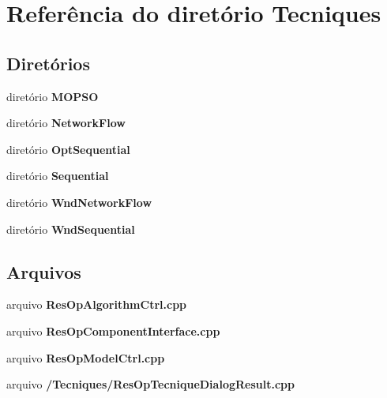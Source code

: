 \section{Referência do diretório Tecniques}
\label{dir_43d5b497050efb90fdba5febc88629da}
\subsection*{Diretórios}
\begin{DoxyCompactItemize}
\item 
diretório {\bf M\+O\+P\+SO}
\item 
diretório {\bf Network\+Flow}
\item 
diretório {\bf Opt\+Sequential}
\item 
diretório {\bf Sequential}
\item 
diretório {\bf Wnd\+Network\+Flow}
\item 
diretório {\bf Wnd\+Sequential}
\end{DoxyCompactItemize}
\subsection*{Arquivos}
\begin{DoxyCompactItemize}
\item 
arquivo {\bf Res\+Op\+Algorithm\+Ctrl.\+cpp}
\item 
arquivo {\bf Res\+Op\+Component\+Interface.\+cpp}
\item 
arquivo {\bf Res\+Op\+Model\+Ctrl.\+cpp}
\item 
arquivo {\bf /\+Tecniques/\+Res\+Op\+Tecnique\+Dialog\+Result.\+cpp}
\end{DoxyCompactItemize}
